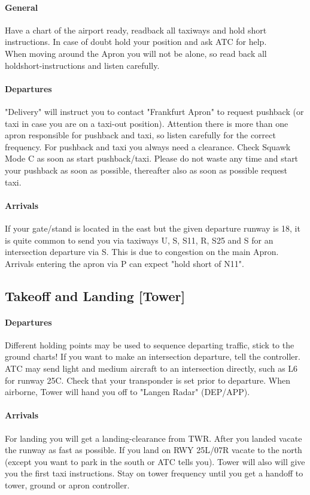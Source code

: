 \paragraph{General}
Have a chart of the airport ready, readback all taxiways and hold short instructions. In case of doubt hold your position and ask ATC for help.\\
When moving around the Apron you will not be alone, so read back all holdshort-instructions and listen carefully.

\paragraph{Departures}
"Delivery" will instruct you to contact "Frankfurt Apron" to request pushback (or taxi in case you are on a taxi-out position). Attention there is more than one apron responsible for pushback and taxi, so listen carefully for the correct frequency.
For pushback and taxi you always need a clearance.
Check Squawk Mode C as soon as start pushback/taxi.
Please do not waste any time and start your pushback as soon as possible, thereafter also as soon as possible request taxi.

\paragraph{Arrivals}
If your gate/stand is located in the east but the given departure runway is 18, it is quite common to send
you via taxiways U, S, S11, R, S25 and S for an intersection departure via S. This is due to congestion on the main Apron.
Arrivals entering the apron via P can expect "hold short of N11".

\subsection[TWR]{Takeoff and Landing [Tower]}

\paragraph{Departures}
Different holding points may be used to sequence departing traffic, stick to the ground charts!
If you want to make an intersection departure, tell the controller. ATC may send light and medium
aircraft to an intersection directly, such as L6 for runway 25C.
Check that your transponder is set prior to departure.
When airborne, Tower will hand you off to "Langen Radar" (DEP/APP). 

\paragraph{Arrivals}
For landing you will get a landing-clearance from TWR.
After you landed vacate the runway as fast as possible.
If you land on RWY 25L/07R vacate to the north (except you want to park in the south or ATC tells you).
Tower will also will give you the first taxi instructions.
Stay on tower frequency until you get a handoff to tower, ground or apron controller.

